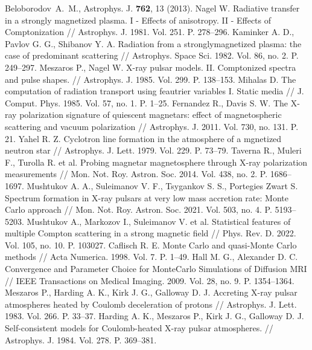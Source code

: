 \documentclass[14pt, russian]{article}
\begin{document}
\begin{thebibliography}{}
%
Beloborodov~A.~M., Astrophys. J. {\bf 762}, 13 (2013).
%
Nagel W. Radiative transfer in a strongly magnetized plasma. I - Effects of
anisotropy. II - Effects of Comptonization // Astrophys. J. 1981. Vol. 251.
P. 278–296.
%
Kaminker A. D., Pavlov G. G., Shibanov Y. A. Radiation from a stronglymagnetized
plasma: the case of predominant scattering // Astrophys. Space
Sci. 1982. Vol. 86, no. 2. P. 249–297.
%
Meszaros P., Nagel W. X-ray pulsar models. II. Comptonized spectra and pulse
shapes. // Astrophys. J. 1985. Vol. 299. P. 138–153.
%
Mihalas D. The computation of radiation transport using feautrier variables I.
Static media // J. Comput. Phys. 1985. Vol. 57, no. 1. P. 1–25.
%
Fernandez R., Davis S. W. The X-ray polarization signature of quiescent magnetars:
effect of magnetospheric scattering and vacuum polarization // Astrophys.
J. 2011. Vol. 730, no. 131. P. 21.
%
Yahel R. Z. Cyclotron line formation in the atmosphere of a mgnetized neutron 
star // Astrophys. J. Lett. 1979. Vol. 229. P. 73–79.
%
Taverna R., Muleri F., Turolla R. et al. Probing magnetar magnetosphere
through X-ray polarization measurements // Mon. Not. Roy. Astron. Soc.
2014. Vol. 438, no. 2. P. 1686–1697.
%
Mushtukov A. A., Suleimanov V. F., Tsygankov S. S., Portegies Zwart S. Spectrum
formation in X-ray pulsars at very low mass accretion rate: Monte Carlo
approach // Mon. Not. Roy. Astron. Soc. 2021. Vol. 503, no. 4. P. 5193–5203.
%
Mushtukov A., Markozov I., Suleimanov V. et al. Statistical features of multiple
Compton scattering in a strong magnetic field // Phys. Rev. D. 2022. Vol.
105, no. 10. P. 103027.
%
Caflisch R. E. Monte Carlo and quasi-Monte Carlo methods // Acta Numerica.
1998. Vol. 7. P. 1–49.
%
Hall M. G., Alexander D. C. Convergence and Parameter Choice for MonteCarlo
Simulations of Diffusion MRI // IEEE Transactions on Medical Imaging.
2009. Vol. 28, no. 9. P. 1354–1364.
%
Meszaros P., Harding A. K., Kirk J. G., Galloway D. J. Accreting X-ray pulsar
atmospheres heated by Coulomb deceleration of protons // Astrophys. J. Lett.
1983. Vol. 266. P. 33–37.
%
Harding A. K., Meszaros P., Kirk J. G., Galloway D. J. Self-consistent models
for Coulomb-heated X-ray pulsar atmospheres. // Astrophys. J. 1984. Vol. 278.
P. 369–381.
%

\end{thebibliography}
\end{document}
